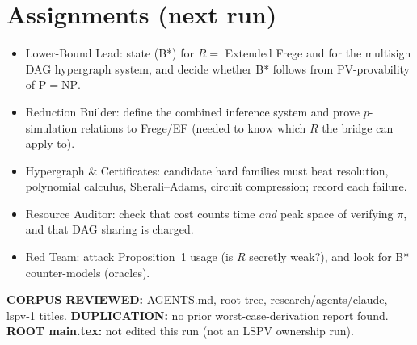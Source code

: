 \documentclass{article}
\begin{document}
\section*{Assignments (next run)}
\begin{itemize}
\item Lower-Bound Lead: state (B*) for $R=$ Extended Frege and for the multisign DAG hypergraph system, and decide whether B* follows from $\mathrm{PV}$-provability of $\mathrm P=\mathrm{NP}$.
\item Reduction Builder: define the combined inference system and prove $p$-simulation relations to Frege/EF (needed to know which $R$ the bridge can apply to).
\item Hypergraph \& Certificates: candidate hard families must beat resolution, polynomial calculus, Sherali--Adams, circuit compression; record each failure.
\item Resource Auditor: check that cost counts time \emph{and} peak space of verifying $\pi$, and that DAG sharing is charged.
\item Red Team: attack Proposition~1 usage (is $R$ secretly weak?), and look for B* counter-models (oracles).
\end{itemize}
\textbf{CORPUS REVIEWED:} AGENTS.md, root tree, research/agents/claude, lspv-1 titles. \textbf{DUPLICATION:} no prior worst-case-derivation report found. \textbf{ROOT main.tex:} not edited this run (not an LSPV ownership run).
\end{document}
